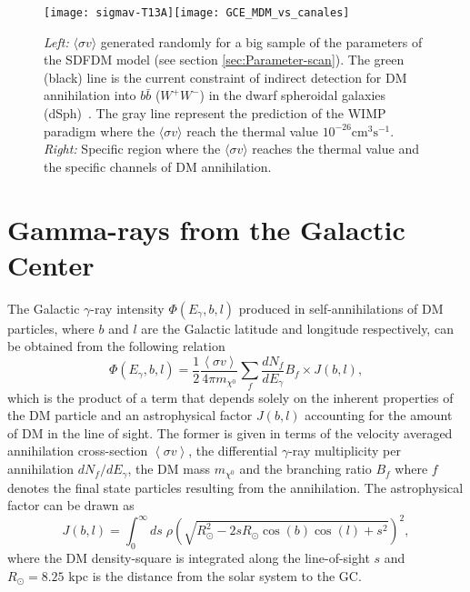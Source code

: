\begin{figure}[h]
\begin{center}
\texttt{[image: sigmav-T13A]}\texttt{[image: GCE\_MDM\_vs\_canales]}
\end{center}
\caption{\textit{Left:} $\langle\sigma v\rangle$ generated randomly for a big sample of the parameters of the SDFDM model (see section \ref{sec:Parameter-scan}). The green (black) line is the current constraint of indirect detection for DM annihilation into $b\bar{b}$ ($W^+W^-$) in the dwarf spheroidal galaxies (dSph)~\cite{Ackermann:2015zua}. The gray line represent the prediction of the WIMP paradigm where the $\langle\sigma v\rangle$ reach the thermal value $10^{-26}\text{cm}^{3}\text{s}^{-1}$. \textit{Right:} Specific region where the $\langle\sigma v\rangle$ reaches the thermal value and the specific channels of DM annihilation.}
\label{fig:good-sv}
\end{figure}











\section{Gamma-rays from the Galactic Center }
\label{sec:gammarays_from_the_GC}
%
The Galactic $\gamma$-ray intensity $\Phi(E_{\gamma},b,l)$ produced in self-annihilations of DM particles, where $b$ and $l$ are the Galactic latitude and longitude respectively, can be obtained from the following relation~\cite{Baltz, Bergstrom,Rott}
\begin{equation}
\Phi(E_{\gamma},b,l)= \frac{1}{2}\frac{\left\langle\sigma v \right\rangle}{4\pi m_{\chi^0}}\sum_{f} \frac{dN_{f}}{dE_{\gamma}}B_f \times J(b,l),
\label{Phi}
\end{equation}
which is the product of a term that depends solely on the inherent properties of the DM particle and an astrophysical factor $J(b,l)$ accounting for the amount of DM in the line of sight.
 The former is given in terms of the velocity averaged annihilation cross-section $\left\langle \sigma v \right\rangle$, the differential $\gamma$-ray multiplicity per annihilation $dN_{f}/dE_{\gamma}$, the DM mass $m_{\chi^0}$ and the branching ratio $B_f$ where $f$ denotes the final state particles resulting from the annihilation. 
The astrophysical factor can be drawn as ~\cite{Bergstrom, Rott}
\begin{equation}
J(b,l)=\int^{\infty}_0 ds\; \rho\left(\sqrt{R^2_{\odot}-2sR_{\odot}\cos(b)\cos(l)+s^2}\right)^2,
\label{J}
\end{equation}
where the DM density-square is integrated along the line-of-sight $s$ and $R_{\odot}=8.25$ kpc is the distance from the solar system to the GC.

